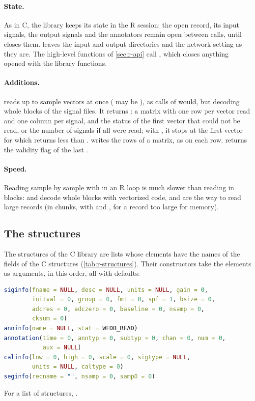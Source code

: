 \paragraph{State.} As in C, the library keeps its state in the R session: the open record,
its input signals, the output signals and the annotators remain open between calls,
until  closes them.  leaves the input and output
directories and the network setting as they are. The high-level functions of
\cref{sec:r-api} call , which closes anything opened with the library
functions.

\paragraph{Additions.}  reads up to  sample vectors
at once ( may be ), as  calls of  would, but
decoding whole blocks of the signal files. It returns : a matrix with
one row per vector read and one column per signal, and the  status of the
first vector that could not be read, or the number of signals if all  were read;
with , it stops at the first vector for which  returns less
than .  writes the rows of a matrix, as  on
each row.  returns the validity flag of the last
.

\paragraph{Speed.} Reading sample by sample with  in an R loop is much slower
than reading in blocks:  and  decode whole blocks with
vectorized code, and are the way to read large records (in chunks, with 
and , for a record too large for memory).

\subsection{The structures}
\label{sec:r-structures}

The structures of the C library are lists whose elements have the names of the fields of
the C structures (\cref{tab:r-structures}). Their constructors take the elements as
arguments, in this order, all with defaults:
\begin{lstlisting}[language=R]
siginfo(fname = NULL, desc = NULL, units = NULL, gain = 0,
        initval = 0, group = 0, fmt = 0, spf = 1, bsize = 0,
        adcres = 0, adczero = 0, baseline = 0, nsamp = 0,
        cksum = 0)
anninfo(name = NULL, stat = WFDB_READ)
annotation(time = 0, anntyp = 0, subtyp = 0, chan = 0, num = 0,
           aux = NULL)
calinfo(low = 0, high = 0, scale = 0, sigtype = NULL,
        units = NULL, caltype = 0)
seginfo(recname = "", nsamp = 0, samp0 = 0)
\end{lstlisting}
For a list of  structures, .

